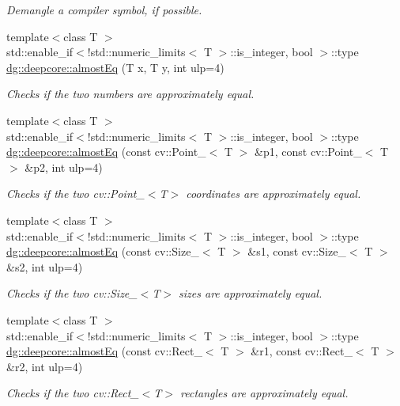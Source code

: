 \begin{DoxyCompactItemize}
\begin{DoxyCompactList}\small\item\em Demangle a compiler symbol, if possible. \end{DoxyCompactList}\item 
{\footnotesize template$<$class T $>$ }\\std\+::enable\+\_\+if$<$!std\+::numeric\+\_\+limits$<$ T $>$\+::is\+\_\+integer, bool $>$\+::type \hyperlink{group___utility_module_gaab89548f655eaadb805d9099ea0ec616}{dg\+::deepcore\+::almost\+Eq} (T x, T y, int ulp=4)
\begin{DoxyCompactList}\small\item\em Checks if the two numbers are approximately equal. \end{DoxyCompactList}\item 
{\footnotesize template$<$class T $>$ }\\std\+::enable\+\_\+if$<$!std\+::numeric\+\_\+limits$<$ T $>$\+::is\+\_\+integer, bool $>$\+::type \hyperlink{group___utility_module_ga2096c3bec84b70855daa9399ec178fe2}{dg\+::deepcore\+::almost\+Eq} (const cv\+::\+Point\+\_\+$<$ T $>$ \&p1, const cv\+::\+Point\+\_\+$<$ T $>$ \&p2, int ulp=4)
\begin{DoxyCompactList}\small\item\em Checks if the two cv\+::\+Point\+\_\+$<$\+T$>$ coordinates are approximately equal. \end{DoxyCompactList}\item 
{\footnotesize template$<$class T $>$ }\\std\+::enable\+\_\+if$<$!std\+::numeric\+\_\+limits$<$ T $>$\+::is\+\_\+integer, bool $>$\+::type \hyperlink{group___utility_module_ga71b9189756badfb3f5466bf9f0549203}{dg\+::deepcore\+::almost\+Eq} (const cv\+::\+Size\+\_\+$<$ T $>$ \&s1, const cv\+::\+Size\+\_\+$<$ T $>$ \&s2, int ulp=4)
\begin{DoxyCompactList}\small\item\em Checks if the two cv\+::\+Size\+\_\+$<$\+T$>$ sizes are approximately equal. \end{DoxyCompactList}\item 
{\footnotesize template$<$class T $>$ }\\std\+::enable\+\_\+if$<$!std\+::numeric\+\_\+limits$<$ T $>$\+::is\+\_\+integer, bool $>$\+::type \hyperlink{group___utility_module_ga115e2428efbb3b6d3105d8f2fab75e51}{dg\+::deepcore\+::almost\+Eq} (const cv\+::\+Rect\+\_\+$<$ T $>$ \&r1, const cv\+::\+Rect\+\_\+$<$ T $>$ \&r2, int ulp=4)
\begin{DoxyCompactList}\small\item\em Checks if the two cv\+::\+Rect\+\_\+$<$\+T$>$ rectangles are approximately equal. \end{DoxyCompactList}\item 

\end{DoxyCompactItemize}
